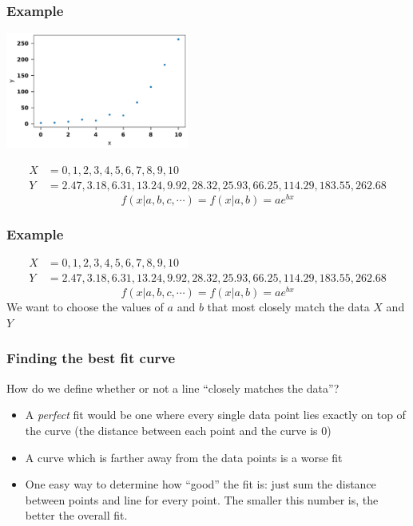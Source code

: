 \documentclass{beamer}
\begin{document}
	\begin{frame}
		\frametitle{Example}
		\begin{center}
				\includegraphics[width=6cm]{example_curve}
		\end{center}
		\small
		\begin{align*}
			X &= 0, 1, 2, 3, 4, 5, 6, 7, 8 ,9, 10\\
			Y &= 2.47,   3.18,   6.31,  13.24,   9.92,  28.32,  25.93,  66.25,
			114.29, 183.55, 262.68
		\end{align*}
		\normalsize
		\begin{equation*}
			f(x|{a, b, c, \cdots})=f(x|{a, b})=ae^{bx}
		\end{equation*}
	\end{frame}


	\begin{frame}
	\frametitle{Example}
	\small
	\begin{align*}
		X &= 0, 1, 2, 3, 4, 5, 6, 7, 8 ,9, 10\\
		Y &= 2.47,   3.18,   6.31,  13.24,   9.92,  28.32,  25.93,  66.25,
		114.29, 183.55, 262.68
	\end{align*}
	\normalsize
	\begin{equation*}
		f(x|{a, b, c, \cdots})=f(x|{a, b})=ae^{bx}
	\end{equation*}
	We want to choose the values of $a$ and $b$ that most closely match the data $X$ and $Y$
	\end{frame}

	\begin{frame}
		\frametitle{Finding the best fit curve}
		How do we define whether or not a line ``closely matches the data''?
		\begin{itemize}
			\item A \textit{perfect} fit would be one where every single data point lies exactly on top of the curve (the distance between each point and the curve is 0)
			\item < 2-> A curve which is farther away from the data points is a worse fit
			\item <3-> One easy way to determine how ``good'' the fit is: just sum the distance between points and line for every point. The smaller this number is, the better the overall fit.
		\end{itemize}
	\end{frame}
\end{document}
